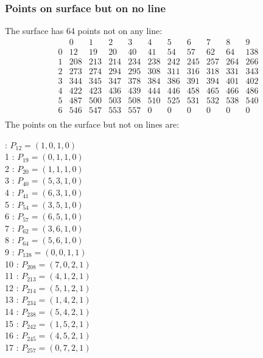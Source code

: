 \documentclass{article}
\begin{document}
{\subsubsection*{Points on surface but on no line}
The surface has 64 points not on any line:\\
$$
\begin{array}{r|*{10}{r}}
 & 0 & 1 & 2 & 3 & 4 & 5 & 6 & 7 & 8 & 9\\
\hline
0 & 12 & 19 & 20 & 40 & 41 & 54 & 57 & 62 & 64 & 138\\
1 & 208 & 213 & 214 & 234 & 238 & 242 & 245 & 257 & 264 & 266\\
2 & 273 & 274 & 294 & 295 & 308 & 311 & 316 & 318 & 331 & 343\\
3 & 344 & 345 & 347 & 378 & 384 & 386 & 391 & 394 & 401 & 402\\
4 & 422 & 423 & 436 & 439 & 444 & 446 & 458 & 465 & 466 & 486\\
5 & 487 & 500 & 503 & 508 & 510 & 525 & 531 & 532 & 538 & 540\\
6 & 546 & 547 & 553 & 557 & 0 & 0 & 0 & 0 & 0 & 0\\
\end{array}
$$
The points on the surface but not on lines are:\\
\begin{multicols}{2}
 : $P_{12}=( 1, 0, 1, 0 )$\\
1 : $P_{19}=( 0, 1, 1, 0 )$\\
2 : $P_{20}=( 1, 1, 1, 0 )$\\
3 : $P_{40}=( 5, 3, 1, 0 )$\\
4 : $P_{41}=( 6, 3, 1, 0 )$\\
5 : $P_{54}=( 3, 5, 1, 0 )$\\
6 : $P_{57}=( 6, 5, 1, 0 )$\\
7 : $P_{62}=( 3, 6, 1, 0 )$\\
8 : $P_{64}=( 5, 6, 1, 0 )$\\
9 : $P_{138}=( 0, 0, 1, 1 )$\\
10 : $P_{208}=( 7, 0, 2, 1 )$\\
11 : $P_{213}=( 4, 1, 2, 1 )$\\
12 : $P_{214}=( 5, 1, 2, 1 )$\\
13 : $P_{234}=( 1, 4, 2, 1 )$\\
14 : $P_{238}=( 5, 4, 2, 1 )$\\
15 : $P_{242}=( 1, 5, 2, 1 )$\\
16 : $P_{245}=( 4, 5, 2, 1 )$\\
17 : $P_{257}=( 0, 7, 2, 1 )$\\

\end{multicols}}
\end{document}
